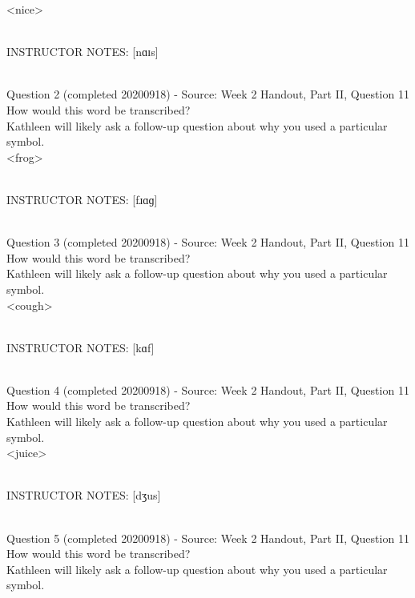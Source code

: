 \documentclass[12pt]{article}
\begin{document}
<nice>


~\\
INSTRUCTOR NOTES: [nɑɪs]


~\\

{\large Question 2} (completed 20200918) - Source: Week 2 Handout, Part II, Question 11\\

How would this word be transcribed?\\ Kathleen will likely ask a follow-up question about why you used a particular symbol.\\

<frog>


~\\
INSTRUCTOR NOTES: [fɹɑɡ]


~\\

{\large Question 3} (completed 20200918) - Source: Week 2 Handout, Part II, Question 11\\

How would this word be transcribed?\\ Kathleen will likely ask a follow-up question about why you used a particular symbol.\\

<cough>


~\\
INSTRUCTOR NOTES: [kɑf]


~\\

{\large Question 4} (completed 20200918) - Source: Week 2 Handout, Part II, Question 11\\

How would this word be transcribed?\\ Kathleen will likely ask a follow-up question about why you used a particular symbol.\\

<juice>


~\\
INSTRUCTOR NOTES: [dʒus]


~\\

{\large Question 5} (completed 20200918) - Source: Week 2 Handout, Part II, Question 11\\

How would this word be transcribed?\\ Kathleen will likely ask a follow-up question about why you used a particular symbol.\\
\end{document}
